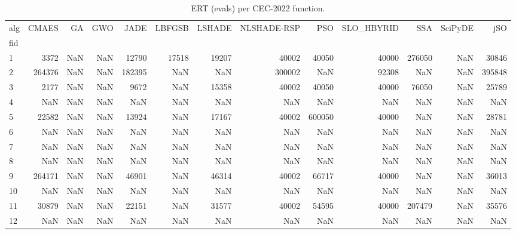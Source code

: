 \begin{table}
\caption{ERT (evals) per CEC-2022 function.}
\label{tab:ert_cec2022}
\begin{tabular}{lrrrrrrrrrrrr}
\toprule
alg & CMAES & GA & GWO & JADE & LBFGSB & LSHADE & NLSHADE-RSP & PSO & SLO_HBYRID & SSA & SciPyDE & jSO \\
fid &  &  &  &  &  &  &  &  &  &  &  &  \\
\midrule
1 & 3372 & NaN & NaN & 12790 & 17518 & 19207 & 40002 & 40050 & 40000 & 276050 & NaN & 30846 \\
2 & 264376 & NaN & NaN & 182395 & NaN & NaN & 300002 & NaN & 92308 & NaN & NaN & 395848 \\
3 & 2177 & NaN & NaN & 9672 & NaN & 15358 & 40002 & 40050 & 40000 & 76050 & NaN & 25789 \\
4 & NaN & NaN & NaN & NaN & NaN & NaN & NaN & NaN & NaN & NaN & NaN & NaN \\
5 & 22582 & NaN & NaN & 13924 & NaN & 17167 & 40002 & 600050 & 40000 & NaN & NaN & 28781 \\
6 & NaN & NaN & NaN & NaN & NaN & NaN & NaN & NaN & NaN & NaN & NaN & NaN \\
7 & NaN & NaN & NaN & NaN & NaN & NaN & NaN & NaN & NaN & NaN & NaN & NaN \\
8 & NaN & NaN & NaN & NaN & NaN & NaN & NaN & NaN & NaN & NaN & NaN & NaN \\
9 & 264171 & NaN & NaN & 46901 & NaN & 46314 & 40002 & 66717 & 40000 & NaN & NaN & 36013 \\
10 & NaN & NaN & NaN & NaN & NaN & NaN & NaN & NaN & NaN & NaN & NaN & NaN \\
11 & 30879 & NaN & NaN & 22151 & NaN & 31577 & 40002 & 54595 & 40000 & 207479 & NaN & 35576 \\
12 & NaN & NaN & NaN & NaN & NaN & NaN & NaN & NaN & NaN & NaN & NaN & NaN \\
\bottomrule
\end{tabular}
\end{table}
